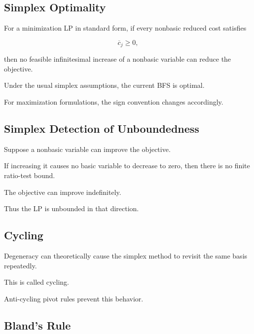 \subsection{Simplex Optimality}
\label{subsec:simplex-optimality}

For a minimization LP in standard form, if every nonbasic reduced cost
satisfies

\[
\boxed{
\overline c_j\geq0,
}
\]

then no feasible infinitesimal increase of a nonbasic variable can reduce
the objective.

Under the usual simplex assumptions, the current BFS is optimal.

For maximization formulations, the sign convention changes accordingly.

\subsection{Simplex Detection of Unboundedness}
\label{subsec:simplex-unboundedness}

Suppose a nonbasic variable can improve the objective.

If increasing it causes no basic variable to decrease to zero, then there
is no finite ratio-test bound.

The objective can improve indefinitely.

Thus the LP is unbounded in that direction.

\subsection{Cycling}
\label{subsec:simplex-cycling}

Degeneracy can theoretically cause the simplex method to revisit the same
basis repeatedly.

This is called cycling.

Anti-cycling pivot rules prevent this behavior.

\subsection{Bland's Rule}
\label{subsec:blands-rule}


